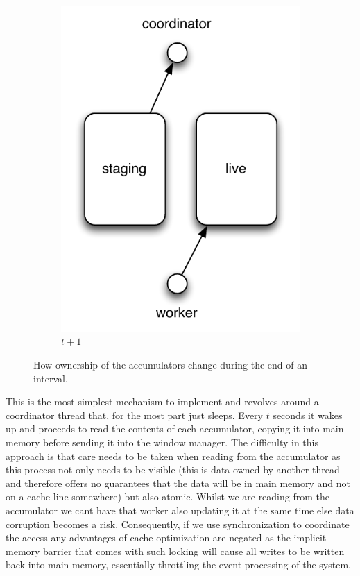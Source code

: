 \documentclass[a4paper,11pt]{scrreprt}
\begin{document}
\begin{figure}[h!]
\begin{subfigure}[t]{2 in}
		\includegraphics[scale=0.7]{async-mode2.pdf}
		\caption{\(t+1\)}\label{fig:asyncmode.tplus1}		
	\end{subfigure}
	\caption{How ownership of the accumulators change during the end of an interval.}
\end{figure}
This is the most simplest mechanism to implement and revolves around a coordinator thread that, for the most part just sleeps. Every \(t\) seconds it wakes up and proceeds to read the contents of each accumulator, copying it into main memory before sending it into the window manager. The difficulty in this approach is that care needs to be taken when reading from the accumulator as this process not only needs to be visible (this is data owned by another thread and therefore offers no guarantees that the data will be in main memory and not on a cache line somewhere) but also atomic. Whilst we are reading from the accumulator we cant have that worker also updating it at the same time else data corruption becomes a risk. Consequently, if we use synchronization to coordinate the access any advantages of cache optimization are negated as the implicit memory barrier that comes with such locking will cause all writes to be written back into main memory, essentially throttling the event processing of the system. 
\end{document}

